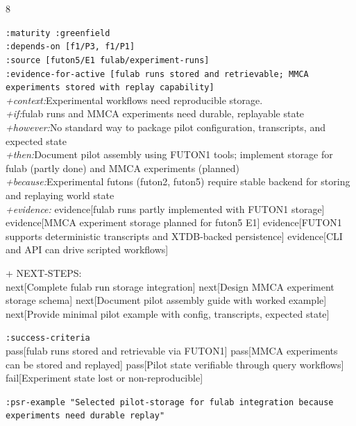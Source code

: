 \documentclass[landscape]{article}
\newcommand{\flexitag}[1]{\textcolor[gray]{0.35}{\textit{#1}}}
\newenvironment{devmapgreenfield}{%
  \def\FrameCommand{\colorbox{devmapgreenfieldbg}}%
  \setlength{\fboxsep}{2pt}%
  \MakeFramed{\advance\hsize-\width \FrameRestore}%
}{\endMakeFramed}
\begin{document}
\begin{paracol}{8}
\begin{devmapgreenfield}
  \texttt{:\allowbreak{}maturity :\allowbreak{}greenfield}\\
  \texttt{:\allowbreak{}depends-\allowbreak{}on [f1/\allowbreak{}P3,\allowbreak{} f1/\allowbreak{}P1]}\\
  \texttt{:\allowbreak{}source [futon5/\allowbreak{}E1 fulab/\allowbreak{}experiment-\allowbreak{}runs]}\\
  \texttt{:\allowbreak{}evidence-\allowbreak{}for-\allowbreak{}active [fulab runs stored and retrievable;\allowbreak{} MMCA experiments stored with replay capability]}\\
  \flexitag{+context:}Experimental workflows need reproducible storage.\\
  \flexitag{+if:}fulab runs and MMCA experiments need durable, replayable state\\
  \flexitag{+however:}No standard way to package pilot configuration, transcripts, and expected state\\
  \flexitag{+then:}Document pilot assembly using FUTON1 tools; implement storage for fulab (partly done) and MMCA experiments (planned)\\
  \flexitag{+because:}Experimental futons (futon2, futon5) require stable backend for storing and replaying world state\\
  \flexitag{+evidence:} evidence[fulab runs partly implemented with FUTON1 storage] evidence[MMCA experiment storage planned for futon5 E1] evidence[FUTON1 supports deterministic transcripts and XTDB-backed persistence] evidence[CLI and API can drive scripted workflows]\\
\par
  + NEXT-STEPS:\\
    next[Complete fulab run storage integration] next[Design MMCA experiment storage schema] next[Document pilot assembly guide with worked example] next[Provide minimal pilot example with config, transcripts, expected state]\\
\par
  \texttt{:\allowbreak{}success-\allowbreak{}criteria}\\
    pass[fulab runs stored and retrievable via FUTON1] pass[MMCA experiments can be stored and replayed] pass[Pilot state verifiable through query workflows] fail[Experiment state lost or non-reproducible]\\
\par
  \texttt{:\allowbreak{}psr-\allowbreak{}example "Selected pilot-\allowbreak{}storage for fulab integration because experiments need durable replay"}\\

\end{devmapgreenfield}
\end{paracol}
\end{document}
